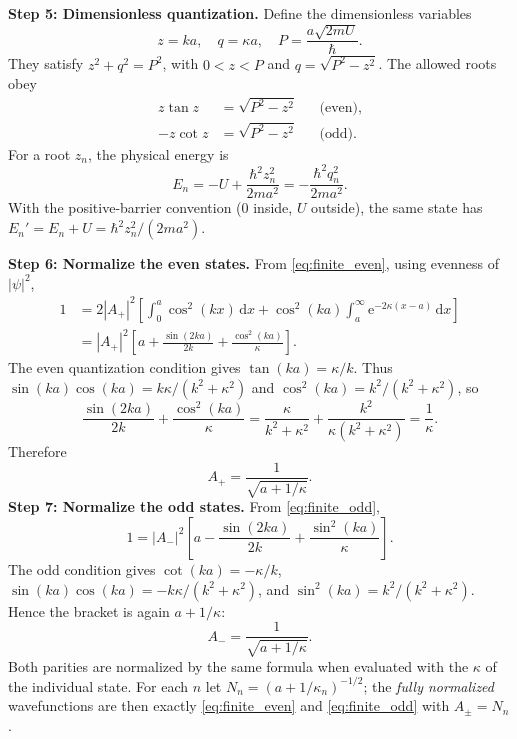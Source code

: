 \documentclass[11pt,a4paper]{article}
\newcommand{\dd}{\mathrm{d}}
\newcommand{\ee}{\mathrm{e}}
\newcommand{\abs}[1]{\left|#1\right|}
\begin{document}
\textbf{Step 5: Dimensionless quantization.} Define the dimensionless variables
\begin{equation}
\boxed{z=ka,\quad q=\kappa a,\quad P=\frac{a\sqrt{2mU}}\hbar.}
\end{equation}
They satisfy $z^2+q^2=P^2$, with $0<z<P$ and $q=\sqrt{P^2-z^2}$. The allowed roots obey
\begin{equation}\label{eq:evenodd_finite}
\boxed{\begin{aligned}z\tan z&=\sqrt{P^2-z^2}&&\text{(even)},\\
-z\cot z&=\sqrt{P^2-z^2}&&\text{(odd)}.
\end{aligned}}
\end{equation}
For a root $z_n$, the physical energy is
\begin{equation}\label{eq:Efinitex}
\boxed{E_n=-U+\frac{\hbar^2z_n^2}{2ma^2}=-\frac{\hbar^2q_n^2}{2ma^2}.}
\end{equation}
With the positive-barrier convention ($0$ inside, $U$ outside), the same state has $E_n'=E_n+U=\hbar^2z_n^2/(2ma^2)$.

\textbf{Step 6: Normalize the even states.} From \eqref{eq:finite_even}, using evenness of $\abs\psi^2$,
\begin{align}
1&=2\abs{A_+}^2\left[\int_0^a\cos^2(kx)\,\dd x+\cos^2(ka)\int_a^\infty\ee^{-2\kappa(x-a)}\,\dd x\right]\\
&=\abs{A_+}^2\left[a+\frac{\sin(2ka)}{2k}+\frac{\cos^2(ka)}{\kappa}\right].
\end{align}
The even quantization condition gives $\tan(ka)=\kappa/k$. Thus $\sin(ka)\cos(ka)=k\kappa/(k^2+\kappa^2)$ and $\cos^2(ka)=k^2/(k^2+\kappa^2)$, so
\begin{equation}
\frac{\sin(2ka)}{2k}+\frac{\cos^2(ka)}{\kappa}
=\frac{\kappa}{k^2+\kappa^2}+\frac{k^2}{\kappa(k^2+\kappa^2)}=\frac1\kappa.
\end{equation}
Therefore
\begin{equation}
\boxed{A_+=\frac1{\sqrt{a+1/\kappa}}.}
\end{equation}
\textbf{Step 7: Normalize the odd states.} From \eqref{eq:finite_odd},
\begin{equation}
1=\abs{A_-}^2\left[a-\frac{\sin(2ka)}{2k}+\frac{\sin^2(ka)}{\kappa}\right].
\end{equation}
The odd condition gives $\cot(ka)=-\kappa/k$, $\sin(ka)\cos(ka)=-k\kappa/(k^2+\kappa^2)$, and $\sin^2(ka)=k^2/(k^2+\kappa^2)$. Hence the bracket is again $a+1/\kappa$:
\begin{equation}
\boxed{A_-=\frac1{\sqrt{a+1/\kappa}}.}
\end{equation}
Both parities are normalized by the same formula when evaluated with the $\kappa$ of the individual state. For each $n$ let $N_n=(a+1/\kappa_n)^{-1/2}$; the \emph{fully normalized} wavefunctions are then exactly \eqref{eq:finite_even} and \eqref{eq:finite_odd} with $A_\pm=N_n$.
\end{document}
